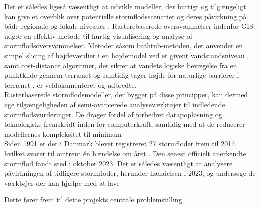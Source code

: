 Det er således ligeså væsentligt at udvikle modeller, der hurtigt og tilgængeligt kan give et overblik over potentielle stormflodsscenarier og deres påvirkning på både regionale og lokale niveauer \citep{balstrom_kirby_inundation}. Rasterebaserede oversvømmelser indenfor GIS udgør en effektiv metode til hurtig visualisering og analyse of stormflodsoversvømmelser. Metoder såsom bathtub-metoden, der anvender en simpel slicing af højdeværdier i en højdemodel ved et givent vandstandsniveau \citep{poulter_raster_2008}, samt cost-distance algoritmer, der sikrer at vandets logiske bevægelse fra en punktkilde gennem terrænet og samtidig tager højde for naturlige barrierer i terrænet \citep{li_delineating_2014}, er veldokumenteret og udbredte.\\
Rasterbaserede stormflodsmodeller, der bygger på disse principper, kan dermed øge tilgængeligheden af semi-avancerede analyseværktøjer til indledende stormflodsvurderinger. De drager fordel af forbedret datapopløsning og teknologiske fremskridt inden for computerkraft, samtidig med at de reducerer modellernes kompleksitet til minimum \citep{balstrom_kirby_inundation}\\



Siden 1991 er der i Danmark blevet registreret 27 stormfloder frem til 2017, hvilket svarer til omtrent én hændelse om året \citep{erhvervsministeriet_fremtidige_nodate}. Den senest officielt anerkendte stormflod fandt sted i oktober 2023. Det er således væsentligt at analysere påvirkningen af tidligere stormfloder, herunder hændelsen i 2023, og undersøge de værktøjer der kan hjælpe med at lave 


Dette fører frem til dette projekts centrale problemstilling 

\begin{center}
\end{center}

